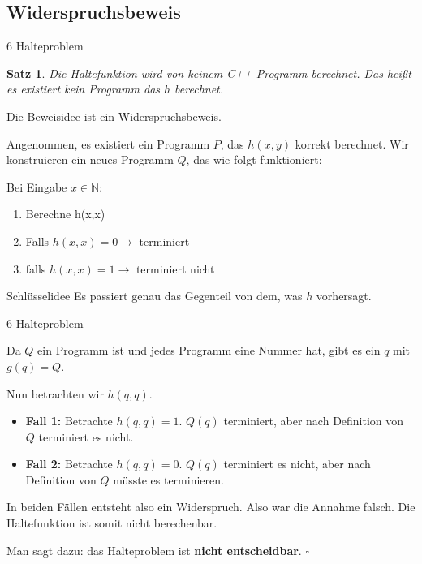 \documentclass{beamer}
\newcommand{\N}{\mathbb{N}}%
\newcommand{\beweis}[1]{\textbf{\structure{Beweis~#1.}}}
\newtheorem{thm}{Satz}
\begin{document}
\subsection{Widerspruchsbeweis}
\begin{frame}{6 Halteproblem}
\begin{thm}
    Die Haltefunktion wird von keinem C++ Programm berechnet. Das heißt es existiert kein Programm das $h$ berechnet.
\end{thm}

\beweis{6}
    Die Beweisidee ist ein Widerspruchsbeweis.
    
    Angenommen, es existiert ein Programm $P$, das $h(x,y)$ korrekt berechnet. Wir konstruieren ein neues Programm $Q$, das wie folgt funktioniert:

    Bei Eingabe $x \in \N$:
    \begin{enumerate}
        \item Berechne h(x,x)
        \item Falls \(h(x,x) = 0 \rightarrow \) terminiert
        \item falls \(h(x,x) = 1\rightarrow \) terminiert nicht 
    \end{enumerate}
    
   
    \begin{block}{Schlüsselidee}
Es passiert genau das \alert{Gegenteil} von dem, was \( h \) vorhersagt.
\end{block}

\end{frame}

\begin{frame}{6 Halteproblem}


   Da $Q$ ein Programm ist und jedes Programm eine Nummer hat, gibt es ein $q$ mit \( g(q) = Q\).

    Nun betrachten wir $h(q,q)$.
    \begin{itemize}
        \item \textbf{Fall 1:} Betrachte \(h(q,q) = 1\). 
    $Q(q)$ terminiert, aber nach Definition von $Q$ terminiert es nicht.
         \item \textbf{Fall 2:} Betrachte \(h(q,q) = 0\).
    $Q(q)$ terminiert es nicht, aber nach Definition von $Q$ müsste es terminieren.

    \end{itemize}
    
\medskip

    In beiden Fällen entsteht also ein Widerspruch. Also war die Annahme falsch. Die Haltefunktion ist somit nicht berechenbar.
    \vspace{0.5em}

Man sagt dazu: das Halteproblem ist \textbf{nicht entscheidbar}. \hfill$\square$
\end{frame}
\end{document}

